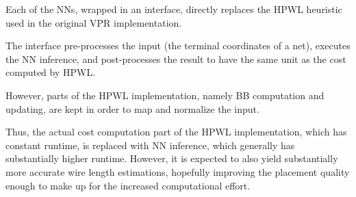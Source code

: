 Each of the \glspl{NN}, wrapped in an interface, directly replaces the \gls{HPWL} heuristic used in the original \gls{VPR} implementation.

The interface pre-processes the input (the terminal coordinates of a net), executes the \gls{NN} inference, and post-processes the result to have the same unit as the cost computed by \gls{HPWL}.

However, parts of the \gls{HPWL} implementation, namely \gls{BB} computation and updating, are kept in order to map and normalize the input.

Thus, the actual cost computation part of the \gls{HPWL} implementation, which has constant runtime, is replaced with \gls{NN} inference, which generally has substantially higher runtime. However, it is expected to also yield substantially more accurate wire length estimations, hopefully improving the placement quality enough to make up for the increased computational effort.


